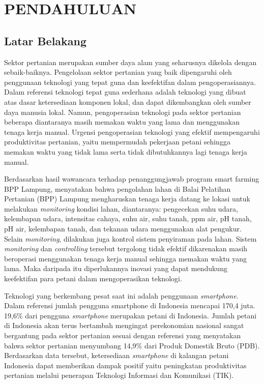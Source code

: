 \chapter{PENDAHULUAN}

\vspace{4.5pt}

\begin{flushleft}
  \begin{justify}
    \section{Latar Belakang} 
    Sektor pertanian merupakan sumber daya alam yang seharusnya dikelola dengan sebaik-baiknya. 
    Pengelolaan sektor pertanian yang baik dipengaruhi oleh penggunaan teknologi yang tepat guna dan keefektifan dalam pengoperasiannya. 
    Dalam referensi \cite{dokumenBalitbang} teknologi tepat guna sederhana adalah teknologi yang dibuat atas dasar ketersediaan komponen lokal, 
    dan dapat dikembangkan oleh sumber daya manusia lokal. Namun, pengoperasian teknologi pada sektor pertanian beberapa diantaranya masih 
    memakan waktu yang lama dan menggunakan tenaga kerja manual. Urgensi pengoperasian teknologi yang efektif mempengaruhi produktivitas 
    pertanian, yaitu mempermudah pekerjaan petani sehingga memakan waktu yang tidak lama serta tidak dibutuhkannya lagi tenaga kerja manual. 

    Berdasarkan hasil wawancara terhadap penanggungjawab program smart farming BPP Lampung, menyatakan bahwa pengolahan lahan di 
    Balai Pelatihan Pertanian (BPP) Lampung mengharuskan tenaga kerja datang ke lokasi untuk melakukan \textit{monitoring} 
    kondisi lahan, diantaranya: pengecekan suhu udara, kelembapan udara, intensitas cahaya, suhu air, suhu tanah, ppm air, 
    pH tanah, pH air, kelembapan tanah, dan tekanan udara menggunakan alat pengukur. Selain \textit{monitoring}, dilakukan juga 
    kontrol sistem penyiraman pada lahan. Sistem \textit{monitoring} dan \textit{controlling} tersebut tergolong tidak efektif 
    dikarenakan masih beroperasi menggunakan tenaga kerja manual sehingga memakan waktu yang lama. Maka daripada itu diperlukannya  
    inovasi yang dapat mendukung keefektifan para petani dalam mengoperasikan teknologi. 

    Teknologi yang berkembang pesat saat ini adalah penggunaan \textit{smartphone}. Dalam referensi \cite{web-datasmartphone} 
    jumlah pengguna smartphone di Indonesia mencapai 170,4 juta. 19,6\% dari pengguna \textit{smartphone} merupakan petani di Indonesia. 
    Jumlah petani di Indonesia akan terus bertambah mengingat perekonomian nasional sangat bergantung pada sektor pertanian sesuai dengan 
    referensi \cite{jurnal-kajianAplikasi} yang menyatakan bahwa sektor pertanian menyumbang 14,9\% dari Produk Domestik Bruto (PDB). Berdasarkan data tersebut, ketersediaan \textit{smartphone} di kalangan petani Indonesia dapat memberikan dampak positif yaitu peningkatan produktivitas pertanian melalui penerapan Teknologi Informasi dan  Komunikasi (TIK). 


\end{justify}
\end{flushleft}
